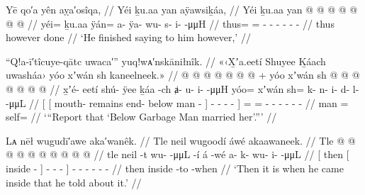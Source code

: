\ex\label{ex:89-182-but-he-said-to-him}%
%
\begingl
	\glpreamble	Yē qo′a yên aỵa′osîqa, //
	\glpreamble	Yéi ḵu.aa yan aÿawsiḵáa, //
	\gla	Yéi ḵu.aa yan @  @ {} @ {} @ {} @ {} @ {} @ {} //
	\glb	yéi= ḵu.aa ÿán= a- ÿa- wu- s- i-  -μμH //
	\glc	thus=  = - - - - -  - //
	\gld	thus however done\•  {} {} {} {} {} {} //
	\glft	‘He finished saying to him however,’
		//
\endgl
\xe

\ex\label{ex:89-183-report-garbage-man-married-her}%
%
\begingl
	\glpreamble	“Q!a-ī′tîcuye-qātc uwaca′” yuq!wᴀ′nskāniłnîk. //
	\glpreamble	«\!‹\!X̱ʼa.eetí Shuyee Ḵáach uwasháa\!› yóo xʼwán sh kaneelneek.\!» //
	\gla	{} {}  @ {}  @ {}  @ {} {}
			 @ {} @ {} @ {} @ {} {} +
		yóo xʼwán sh @  @ {} @ {} @ {} @ {} @ {} @ {} //
	\glb	{} {} x̱ʼé- eetí shú- ÿee ḵáa -ch {}
			ⱥ- u- i-  -μμH {}
		yóo= xʼwán sh= k- n- i- d- l-  -μμL //
	\glc	{}[ {}[ mouth- remains end- below man - {}]
			- - -  - {}]
		=  = - - - - -
			 - //
	\gld	{} {}  {}  {} man {} {}
			 {} {} {} {} {}
		=  self=  {} {} {} {} {} {} //
	\glft	‘“Report that ‘Below Garbage Man married her’.”’
		//
\endgl
\xe

\ex\label{ex:89-184-when-inside-told-about-it}%
%
\begingl
	\glpreamble	Lᴀ nēł wugudī′awe aka′wanêk. //
	\glpreamble	Tle neil wugoodí áwé akaawaneek. //
	\gla	{} Tle {}  @ {} {}
			 @ {} @ {} @ {} {}
		 @ {}
		 @ {} @ {} @ {} @ {} @ {} //
	\glb	{} tle {} neil -t {}
			wu-  -μμL -í {}
		á -wé
		a- k- wu- i-  -μμL //
	\glc	{}[ then {}[ inside - {}]
			-  - - {}]
		 -
		- - - -  - //
	\gld	{} then {} inside -to {}
			 {} {} -when {}
		 {}
		 {} {} {} {} {} //
	\glft	‘Then it is when he came inside that he told about it.’
		//
\endgl
\xe

